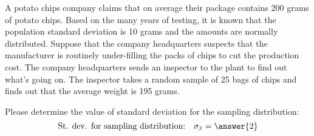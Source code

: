 \documentclass{ximera}
\begin{document}
\begin{example}
A potato chips company claims that on average their package contains 200 grams of potato chips. Based on the many years of testing, it is known that the population standard deviation is 10 grams and the amounts are normally distributed. Suppose that the company headquarters suspects that the manufacturer is routinely under-filling the packs of chips to cut the production cost. The company headquarters sends an inspector to the plant to find out what’s going on. The inspector takes a random sample of 25 bags of chips and finds out that the average weight is 195 grams. 

\begin{question}
Please determine the value of standard deviation for the sampling distribution:
$$\mbox{St. dev. for sampling distribution:}\quad\sigma_{\bar{x}}= \answer{2}$$
\end{question}


\end{example}
\end{document}
